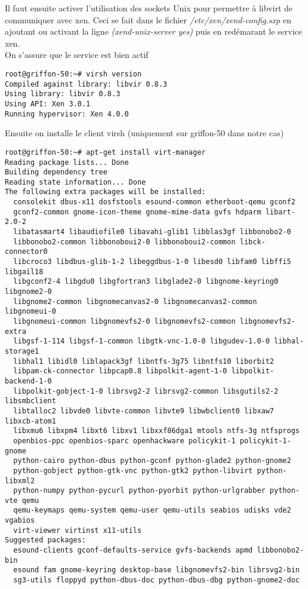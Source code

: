\documentclass{article}
\begin{document}
Il faut ensuite activer l'utilisation des sockets Unix pour permettre à libvirt de communiquer avec xen. Ceci se fait dans le fichier \emph{/etc/xen/xend-config.sxp} en ajoutant ou activant la ligne \emph{(xend-unix-server yes)} puis en redémarant le service xen.\\
On s'assure que le service est bien actif
\begin{lstlisting}
root@griffon-50:~# virsh version
Compiled against library: libvir 0.8.3
Using library: libvir 0.8.3
Using API: Xen 3.0.1
Running hypervisor: Xen 4.0.0
\end{lstlisting}
Ensuite on installe le client virsh (uniquement sur griffon-50 dans notre cas)
\begin{lstlisting}
root@griffon-50:~# apt-get install virt-manager
Reading package lists... Done
Building dependency tree       
Reading state information... Done
The following extra packages will be installed:
  consolekit dbus-x11 dosfstools esound-common etherboot-qemu gconf2
  gconf2-common gnome-icon-theme gnome-mime-data gvfs hdparm libart-2.0-2
  libatasmart4 libaudiofile0 libavahi-glib1 libblas3gf libbonobo2-0
  libbonobo2-common libbonoboui2-0 libbonoboui2-common libck-connector0
  libcroco3 libdbus-glib-1-2 libeggdbus-1-0 libesd0 libfam0 libffi5 libgail18
  libgconf2-4 libgdu0 libgfortran3 libglade2-0 libgnome-keyring0 libgnome2-0
  libgnome2-common libgnomecanvas2-0 libgnomecanvas2-common libgnomeui-0
  libgnomeui-common libgnomevfs2-0 libgnomevfs2-common libgnomevfs2-extra
  libgsf-1-114 libgsf-1-common libgtk-vnc-1.0-0 libgudev-1.0-0 libhal-storage1
  libhal1 libidl0 liblapack3gf libntfs-3g75 libntfs10 liborbit2
  libpam-ck-connector libpcap0.8 libpolkit-agent-1-0 libpolkit-backend-1-0
  libpolkit-gobject-1-0 librsvg2-2 librsvg2-common libsgutils2-2 libsmbclient
  libtalloc2 libvde0 libvte-common libvte9 libwbclient0 libxaw7 libxcb-atom1
  libxmu6 libxpm4 libxt6 libxv1 libxxf86dga1 mtools ntfs-3g ntfsprogs
  openbios-ppc openbios-sparc openhackware policykit-1 policykit-1-gnome
  python-cairo python-dbus python-gconf python-glade2 python-gnome2
  python-gobject python-gtk-vnc python-gtk2 python-libvirt python-libxml2
  python-numpy python-pycurl python-pyorbit python-urlgrabber python-vte qemu
  qemu-keymaps qemu-system qemu-user qemu-utils seabios udisks vde2 vgabios
  virt-viewer virtinst x11-utils
Suggested packages:
  esound-clients gconf-defaults-service gvfs-backends apmd libbonobo2-bin
  esound fam gnome-keyring desktop-base libgnomevfs2-bin librsvg2-bin
  sg3-utils floppyd python-dbus-doc python-dbus-dbg python-gnome2-doc

\end{lstlisting}
\end{document}
